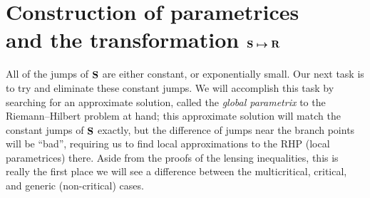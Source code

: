 \documentclass[10pt,a4paper]{amsart}
\DeclareMathOperator{\boldS}{{\bf S}}
\numberwithin{equation}{section}
\begin{document}
\section[Construction of parametrices and the transformation ${\bf S} \mapsto {\bf R}$]{Construction of parametrices \\ and the transformation $\boldsymbol{{\bf S} \mapsto {\bf R}}$}\label{section6}
All of the jumps of $\boldS$ are either constant, or exponentially small. Our next task is to try and eliminate these constant jumps. We will accomplish this task by searching for an approximate solution, called the \textit{global parametrix} to the Riemann--Hilbert problem at hand; this
approximate solution will match the constant jumps of $\boldS$ exactly, but the difference of jumps near the branch points will be ``bad'', requiring us to find local approximations to the RHP (local parametrices) there. Aside from the proofs of the lensing inequalities, this is really the first place we will see a difference between the multicritical, critical, and generic (non-critical) cases.
\end{document}
